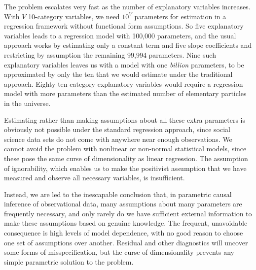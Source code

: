 \documentclass[11pt,titlepage]{article}
\begin{document}
The problem escalates very fast as the number of explanatory variables
increases.  With $V$ 10-category variables, we need $10^V$ parameters
for estimation in a regression framework without functional form
assumptions.  So five explanatory variables leads to a regression
model with 100,000 parameters, and the usual approach works by
estimating only a constant term and five slope coefficients and
restricting by assumption the remaining 99,994 parameters.  Nine such
explanatory variables leaves us with a model with one \emph{billion}
parameters, to be approximated by only the ten that we would estimate
under the traditional approach.  Eighty ten-category explanatory
variables would require a regression model with more parameters than
the estimated number of elementary particles in the universe.

Estimating rather than making assumptions about all these extra
parameters is obviously not possible under the standard regression
approach, since social science data sets do not come with anywhere
near enough observations.  We cannot avoid the problem with nonlinear
or non-normal statistical models, since these pose the same curse of
dimensionality as linear regression.  The assumption of ignorability,
which enables us to make the positivist assumption that we have
measured and observe all necessary variables, is insufficient.

Instead, we are led to the inescapable conclusion that, in parametric
causal inference of observational data, many assumptions about many
parameters are frequently necessary, and only rarely do we have
sufficient external information to make these assumptions based on
genuine knowledge.  The frequent, unavoidable consequence is high
levels of model dependence, with no good reason to choose one set of
assumptions over another.  Residual and other diagnostics will uncover
some forms of misspecification, but the curse of dimensionality
prevents any simple parametric solution to the problem.
\end{document}
